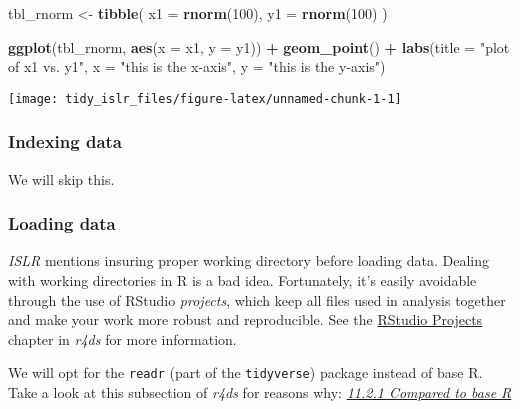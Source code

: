 \documentclass[]{book}
\newenvironment{Shaded}{\begin{snugshade}}{\end{snugshade}}
\newcommand{\DataTypeTok}[1]{\textcolor[rgb]{0.13,0.29,0.53}{#1}}
\newcommand{\DecValTok}[1]{\textcolor[rgb]{0.00,0.00,0.81}{#1}}
\newcommand{\KeywordTok}[1]{\textcolor[rgb]{0.13,0.29,0.53}{\textbf{#1}}}
\newcommand{\NormalTok}[1]{#1}
\newcommand{\OperatorTok}[1]{\textcolor[rgb]{0.81,0.36,0.00}{\textbf{#1}}}
\newcommand{\StringTok}[1]{\textcolor[rgb]{0.31,0.60,0.02}{#1}}
\begin{document}
\begin{Shaded}
\begin{Highlighting}[]
\NormalTok{tbl_rnorm <-}\StringTok{ }\KeywordTok{tibble}\NormalTok{(}
  \DataTypeTok{x1 =} \KeywordTok{rnorm}\NormalTok{(}\DecValTok{100}\NormalTok{),}
  \DataTypeTok{y1 =} \KeywordTok{rnorm}\NormalTok{(}\DecValTok{100}\NormalTok{)}
\NormalTok{)}

\KeywordTok{ggplot}\NormalTok{(tbl_rnorm, }\KeywordTok{aes}\NormalTok{(}\DataTypeTok{x =}\NormalTok{ x1, }\DataTypeTok{y =}\NormalTok{ y1)) }\OperatorTok{+}\StringTok{ }
\StringTok{  }\KeywordTok{geom_point}\NormalTok{() }\OperatorTok{+}\StringTok{ }
\StringTok{  }\KeywordTok{labs}\NormalTok{(}\DataTypeTok{title =} \StringTok{"plot of x1 vs. y1"}\NormalTok{,}
       \DataTypeTok{x =} \StringTok{"this is the x-axis"}\NormalTok{,}
       \DataTypeTok{y =} \StringTok{"this is the y-axis"}\NormalTok{)}
\end{Highlighting}
\end{Shaded}

\begin{center}\texttt{[image: tidy\_islr\_files/figure-latex/unnamed-chunk-1-1]} \end{center}

\hypertarget{indexing-data}{%
\subsubsection{Indexing data}\label{indexing-data}}

We will skip this.

\hypertarget{loading-data}{%
\subsubsection{Loading data}\label{loading-data}}

\emph{ISLR} mentions insuring proper working directory before loading data. Dealing with working directories in R is a bad idea. Fortunately, it's easily avoidable through the use of RStudio \emph{projects}, which keep all files used in analysis together and make your work more robust and reproducible. See the \href{http://r4ds.had.co.nz/workflow-projects.html}{RStudio Projects} chapter in \emph{r4ds} for more information.

We will opt for the \texttt{readr} (part of the \texttt{tidyverse}) package instead of base R. Take a look at this subsection of \emph{r4ds} for reasons why:
\href{http://r4ds.had.co.nz/data-import.html}{\emph{11.2.1 Compared to base R}}
\end{document}
